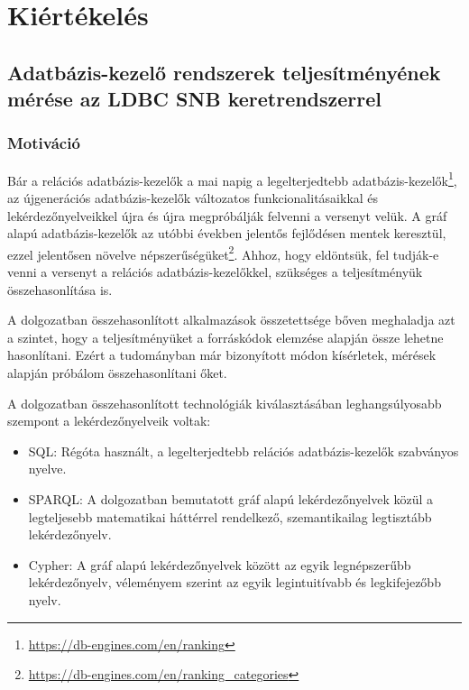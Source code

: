 \newcommand{\plotscale}{0.6}

\chapter{Kiértékelés} \label{sec:kiertekeles}
\section{Adatbázis-kezelő rendszerek teljesítményének mérése az LDBC SNB keretrendszerrel}
\subsection{Motiváció}

Bár a relációs adatbázis-kezelők a mai napig a legelterjedtebb adatbázis-kezelők\footnote{\url{https://db-engines.com/en/ranking}}, az újgenerációs adatbázis-kezelők változatos funkcionalitásaikkal és lekérdezőnyelveikkel újra és újra megpróbálják felvenni a versenyt velük. A gráf alapú adatbázis-kezelők az utóbbi években jelentős fejlődésen mentek keresztül, ezzel jelentősen növelve népszerűségüket\footnote{\url{https://db-engines.com/en/ranking_categories}}. Ahhoz, hogy eldöntsük, fel tudják-e venni a versenyt a relációs adatbázis-kezelőkkel, szükséges a teljesítményük összehasonlítása is. 

A dolgozatban összehasonlított alkalmazások összetettsége bőven meghaladja azt a szintet, hogy a teljesítményüket a forráskódok elemzése alapján össze lehetne hasonlítani. Ezért a tudományban már bizonyított módon kísérletek, mérések alapján próbálom összehasonlítani őket.

A dolgozatban összehasonlított technológiák kiválasztásában leghangsúlyosabb szempont a lekérdezőnyelveik voltak:
\begin{itemize}
	\item SQL: Régóta használt, a legelterjedtebb relációs adatbázis-kezelők szabványos nyelve.
	\item SPARQL: A dolgozatban bemutatott gráf alapú lekérdezőnyelvek közül a legteljesebb matematikai háttérrel rendelkező, szemantikailag legtisztább lekérdezőnyelv.
	\item Cypher: A gráf alapú lekérdezőnyelvek között az egyik legnépszerűbb lekérdezőnyelv, véleményem szerint az egyik legintuitívabb és legkifejezőbb nyelv.
\end{itemize}


